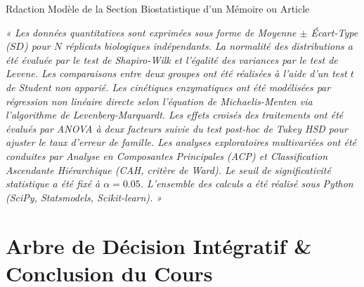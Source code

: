 \documentclass[aspectratio=169,10pt]{beamer}
\begin{document}
\begin{frame}{Rdaction Modèle de la Section Biostatistique d'un Mémoire ou Article}
  \begin{tcolorbox}[colback=BioNavy!5, colframe=BioNavy, title={\faEdit\quad Modèle de Paragraphe pour la Section « Matériels \& Méthodes »}, width=\linewidth, boxrule=0.8pt, left=5pt, right=5pt]
    \footnotesize
    \textit{« Les données quantitatives sont exprimées sous forme de Moyenne $\pm$ Écart-Type ($SD$) pour $N$ réplicats biologiques indépendants. La normalité des distributions a été évaluée par le test de Shapiro-Wilk et l'égalité des variances par le test de Levene. Les comparaisons entre deux groupes ont été réalisées à l'aide d'un test $t$ de Student non apparié. Les cinétiques enzymatiques ont été modélisées par régression non linéaire directe selon l'équation de Michaelis-Menten via l'algorithme de Levenberg-Marquardt. Les effets croisés des traitements ont été évalués par ANOVA à deux facteurs suivie du test post-hoc de Tukey HSD pour ajuster le taux d'erreur de famille. Les analyses exploratoires multivariées ont été conduites par Analyse en Composantes Principales (ACP) et Classification Ascendante Hiérarchique (CAH, critère de Ward). Le seuil de significativité statistique a été fixé à $\alpha = 0.05$. L'ensemble des calculs a été réalisé sous Python (SciPy, Statsmodels, Scikit-learn). »}
  \end{tcolorbox}
\end{frame}

\section{Arbre de Décision Intégratif \& Conclusion du Cours}
\end{document}
